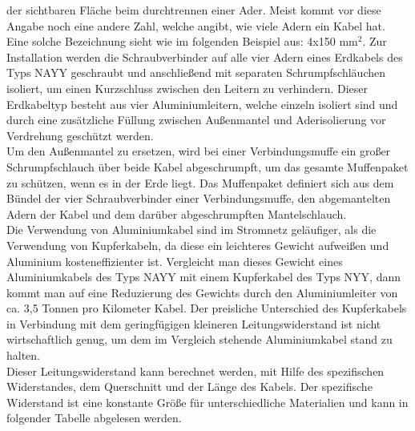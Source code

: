 der sichtbaren Fläche beim durchtrennen einer Ader. Meist kommt vor diese Angabe noch eine andere Zahl, welche angibt, wie viele Adern ein Kabel hat. Eine 
solche Bezeichnung sieht wie im folgenden Beispiel aus: 4x150 $\text{mm}^2$. Zur Installation werden die Schraubverbinder auf alle vier Adern eines Erdkabels des 
Typs NAYY geschraubt und anschließend mit separaten Schrumpfschläuchen isoliert, um einen Kurzschluss zwischen den Leitern zu verhindern. Dieser Erdkabeltyp 
besteht aus vier Aluminiumleitern, welche einzeln isoliert sind und durch eine zusätzliche Füllung zwischen Außenmantel und Aderisolierung vor Verdrehung 
geschützt werden.%
\\
Um den Außenmantel zu ersetzen, wird bei einer Verbindungsmuffe ein großer Schrumpfschlauch über beide Kabel abgeschrumpft, um das gesamte Muffenpaket zu 
schützen, wenn es in der Erde liegt. Das Muffenpaket definiert sich aus dem Bündel der vier Schraubverbinder einer Verbindungsmuffe, den abgemantelten Adern 
der Kabel und dem darüber abgeschrumpften Mantelschlauch. %
\\
Die Verwendung von Aluminiumkabel sind im Stromnetz geläufiger, als die Verwendung von Kupferkabeln, da diese ein leichteres Gewicht aufweißen und Aluminium 
kosteneffizienter ist. Vergleicht man dieses Gewicht eines Aluminiumkabels des Typs NAYY mit einem Kupferkabel des Typs NYY, dann kommt man auf eine 
Reduzierung des Gewichts durch den Aluminiumleiter von ca. 3,5 Tonnen pro Kilometer Kabel. Der preisliche Unterschied des Kupferkabels in Verbindung mit dem 
geringfügigen kleineren Leitungswiderstand ist nicht wirtschaftlich genug, um dem im Vergleich stehende Aluminiumkabel stand zu halten.%
\\
Dieser Leitungswiderstand kann berechnet werden, mit Hilfe des spezifischen Widerstandes, dem Querschnitt und der Länge des Kabels. Der spezifische Widerstand 
ist eine konstante Größe für unterschiedliche Materialien und kann in folgender Tabelle abgelesen werden.

